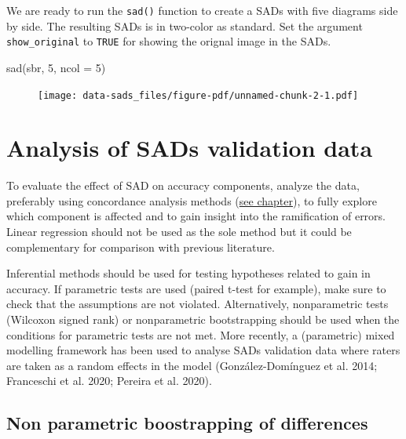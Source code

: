 \documentclass[
  letterpaper,
]{book}
\newenvironment{Shaded}{\begin{snugshade}}{\end{snugshade}}
\newcommand{\AttributeTok}[1]{\textcolor[rgb]{0.40,0.45,0.13}{#1}}
\newcommand{\DecValTok}[1]{\textcolor[rgb]{0.68,0.00,0.00}{#1}}
\newcommand{\FunctionTok}[1]{\textcolor[rgb]{0.28,0.35,0.67}{#1}}
\newcommand{\NormalTok}[1]{\textcolor[rgb]{0.00,0.23,0.31}{#1}}
\begin{document}
We are ready to run the \texttt{sad()} function to create a SADs with
five diagrams side by side. The resulting SADs is in two-color as
standard. Set the argument \texttt{show\_original} to \texttt{TRUE} for
showing the orignal image in the SADs.

\begin{Shaded}
\begin{Highlighting}[]
\FunctionTok{sad}\NormalTok{(sbr, }\DecValTok{5}\NormalTok{, }\AttributeTok{ncol =} \DecValTok{5}\NormalTok{)}
\end{Highlighting}
\end{Shaded}

\begin{figure}[H]

{\centering \texttt{[image: data-sads\_files/figure-pdf/unnamed-chunk-2-1.pdf]}

}

\end{figure}

\hypertarget{analysis-of-sads-validation-data}{%
\section{Analysis of SADs validation
data}\label{analysis-of-sads-validation-data}}

To evaluate the effect of SAD on accuracy components, analyze the data,
preferably using concordance analysis methods
(\href{data-accuracy.html}{see chapter}), to fully explore which
component is affected and to gain insight into the ramification of
errors. Linear regression should not be used as the sole method but it
could be complementary for comparison with previous literature.

Inferential methods should be used for testing hypotheses related to
gain in accuracy. If parametric tests are used (paired t-test for
example), make sure to check that the assumptions are not violated.
Alternatively, nonparametric tests (Wilcoxon signed rank) or
nonparametric bootstrapping should be used when the conditions for
parametric tests are not met. More recently, a (parametric) mixed
modelling framework has been used to analyse SADs validation data where
raters are taken as a random effects in the model (González-Domínguez et
al. 2014; Franceschi et al. 2020; Pereira et al. 2020).

\hypertarget{non-parametric-boostrapping-of-differences}{%
\subsection{Non parametric boostrapping of
differences}\label{non-parametric-boostrapping-of-differences}}
\end{document}
